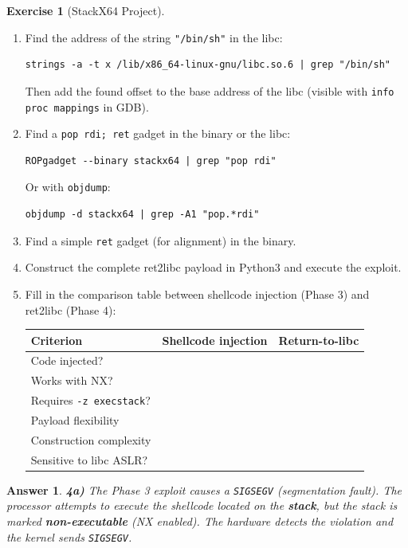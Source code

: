 \documentclass[a4paper,11pt]{article}
\theoremstyle{plain}
\newtheorem{correction}{Answer}
\theoremstyle{definition}
\newtheorem{exercice}{Exercise}
\begin{document}
\begin{exercice}[StackX64 Project]
\begin{enumerate}
\item[\textbf{4c)}] Find the address of the string \texttt{"/bin/sh"} in the libc:
\begin{lstlisting}[style=GDBStyle]
strings -a -t x /lib/x86_64-linux-gnu/libc.so.6 | grep "/bin/sh"
\end{lstlisting}
Then add the found offset to the base address of the libc (visible with \texttt{info proc mappings} in GDB).

\item[\textbf{4d)}] Find a \texttt{pop rdi; ret} gadget in the binary or the libc:
\begin{lstlisting}[style=GDBStyle]
ROPgadget --binary stackx64 | grep "pop rdi"
\end{lstlisting}
Or with \texttt{objdump}:
\begin{lstlisting}[style=GDBStyle]
objdump -d stackx64 | grep -A1 "pop.*rdi"
\end{lstlisting}

\item[\textbf{4e)}] Find a simple \texttt{ret} gadget (for alignment) in the binary.

\item[\textbf{4f)}] Construct the complete ret2libc payload in Python3 and execute the exploit.

\item[\textbf{4g)}] Fill in the comparison table between shellcode injection (Phase 3) and ret2libc (Phase 4):
\begin{center}
\begin{tabular}{lcc}
\toprule
\textbf{Criterion} & \textbf{Shellcode injection} & \textbf{Return-to-libc} \\
\midrule
Code injected? & & \\
Works with NX? & & \\
Requires \texttt{-z execstack}? & & \\
Payload flexibility & & \\
Construction complexity & & \\
Sensitive to libc ASLR? & & \\
\bottomrule
\end{tabular}
\end{center}
\end{enumerate}

\begin{correction}

\textbf{4a)} The Phase 3 exploit causes a \texttt{SIGSEGV} (segmentation fault). The processor attempts to execute the shellcode located on the \textbf{stack}, but the stack is marked \textbf{non-executable} (NX enabled). The hardware detects the violation and the kernel sends \texttt{SIGSEGV}.


\end{correction}
\end{exercice}
\end{document}
